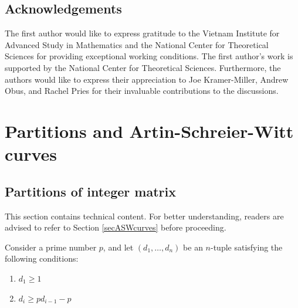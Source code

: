\documentclass{compositio}
\theoremstyle{remark}
\theoremstyle{remark}
\begin{document}
\subsection{Acknowledgements}
The first author would like to express gratitude to the Vietnam Institute for Advanced Study in Mathematics and the National Center for Theoretical Sciences for providing exceptional working conditions. The first author's work is supported by the National Center for Theoretical Sciences. Furthermore, the authors would like to express their appreciation to Joe Kramer-Miller, Andrew Obus, and Rachel Pries for their invaluable contributions to the discussions.

\section{Partitions and Artin-Schreier-Witt curves}
\label{secpartionASW}

\subsection{Partitions of integer matrix}
\label{secpartitionmatrix}
This section contains technical content. For better understanding, readers are advised to refer to Section \ref{secASWcurves} before proceeding.

Consider a prime number $p$, and let $(d_1, \ldots, d_n)$ be an $n$-tuple satisfying the following conditions:
\begin{enumerate}[label*=\alph*)]
\item $d_1 \geq 1$
\item $d_i \geq pd_{i-1}-p$
\end{enumerate}
\end{document}
